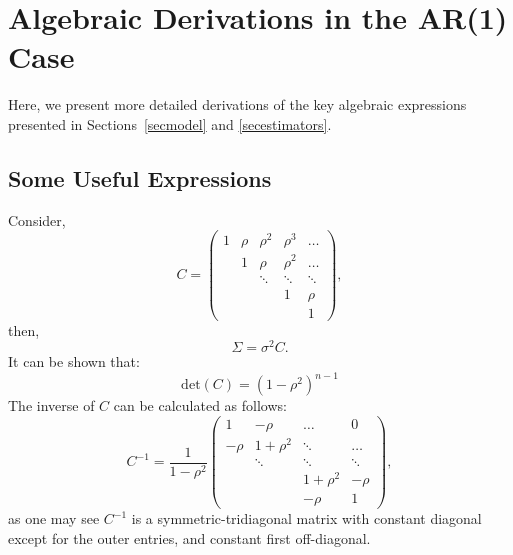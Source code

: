 \documentclass[11pt,a5paper,twoside]{book}
\begin{document}
{\section{Algebraic Derivations in the AR(1) Case\label{ar1appendix}}

Here, we present more detailed derivations of the key algebraic expressions presented in Sections~\ref{secmodel} and \ref{secestimators}.


\subsection{Some Useful Expressions}\label{suppexp}

Consider,
\begin{equation}
\label{C}
C =
 \begin{pmatrix}
  1 & \rho & \rho^2 & \rho^3&\ldots \\
   & 1 & \rho & \rho^2 &\ldots \\
   &   & \ddots & \ddots &\ddots  \\
   & & & 1 & \rho\\
   &  & & & 1
 \end{pmatrix},
\end{equation}
then,
\begin{equation}
\label{suppSigma}
\Sigma= \sigma^2 C.
\end{equation}
It can be shown that:
\begin{equation}
\label{det_C}
\mathrm{det}(C)=\left(1-\rho^2 \right)^{n-1}
\end{equation}
The inverse of $C$ can be calculated as follows:
\begin{equation}
\label{inv_C}
C^{-1} =\frac{1}{1-\rho^2}
 \begin{pmatrix}
  1 & -\rho & \ldots & 0 \\
  -\rho & 1+\rho^2 & \ddots & \ldots \\
   &   \ddots & \ddots &\ddots  \\
   &  & 1+\rho^2& -\rho\\
   &   &-\rho& 1
 \end{pmatrix},
\end{equation}
as one may see $C^{-1}$ is a symmetric-tridiagonal matrix with constant diagonal except for the outer entries, and constant first off-diagonal.

}
\end{document}
